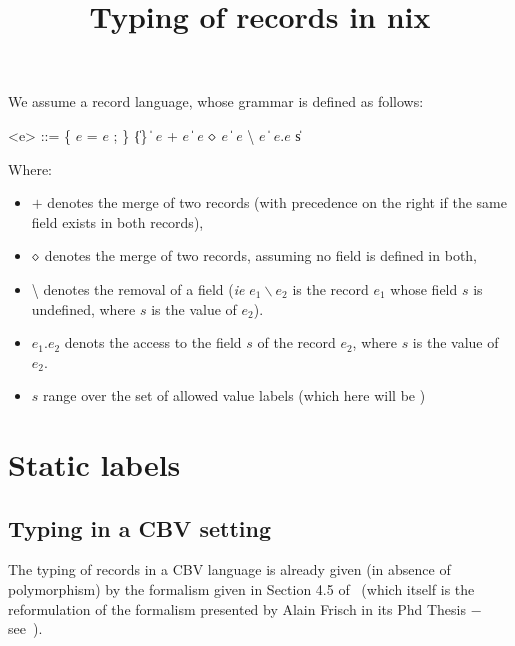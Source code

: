 

\title{Typing of records in nix}



\maketitle{}

We assume a record language, whose grammar is defined as follows:

\begin{grammar}
  <e> ::= \{ $e$ = $e$ ; \} \| \{\}
    \| $e$ + $e$
    \| $e$ $\diamond{}$ $e$
    \| $e$ \textbackslash{} $e$
    \| $e$.$e$
    \| s
\end{grammar}

Where:
\begin{itemize}
  \item $+$ denotes the merge of two records (with precedence on the right if
    the same field exists in both records),
  \item $\diamond{}$ denotes the merge of two records, assuming no field is
    defined in both,
  \item \textbackslash{} denotes the removal of a field (\emph{ie} $e_1
    \backslash e_2$ is the record $e_1$ whose field $s$ is undefined, where $s$
    is the value of $e_2$).
  \item $e_1.e_2$ denots the access to the field $s$ of the record $e_2$,
    where $s$ is the value of $e_2$.
  \item $s$ range over the set of allowed value labels (which here will be )
\end{itemize}

\section{Static labels}
\subsection{Typing in a CBV setting}
The typing of records in a CBV language is already given (in absence of
polymorphism) by the formalism given in Section 4.5 of~\cite{Cas15} (which itself
is the reformulation of the formalism presented by Alain Frisch in its Phd
Thesis − see~\cite{Fri04}).

